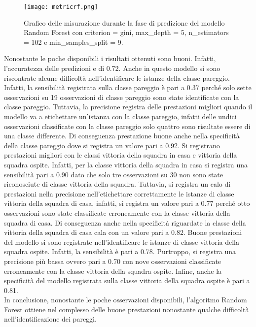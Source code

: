 \begin{figure}[]
	\begin{center}
		\texttt{[image: metricrf.png]}
		\caption{Grafico delle misurazione durante la fase di predizione del modello Random Forest con \textsf{criterion} = gini, \textsf{max\_depth} = 5, \textsf{n\_estimators} = 102 e \textsf{min\_samples\_split} = 9.
		} 
		\label{fig:rfmetrics}
	\end{center}
\end{figure}
Nonostante le poche disponibili i risultati ottenuti sono buoni. Infatti, l'accuratezza delle predizioni e di 0.72. Anche in questo modello si sono riscontrate alcune difficoltà nell'identificare le istanze della classe pareggio. Infatti, la sensibilità registrata sulla classe pareggio è pari a 0.37 perché solo sette osservazioni su 19 osservazioni di classe pareggio sono state identificate con la classe pareggio. Tuttavia, la precisione registra delle prestazioni migliori quando il modello va a etichettare un'istanza con la classe pareggio, infatti delle undici osservazioni classificate con la classe pareggio solo quattro sono risultate essere di una classe differente. Di conseguenza prestazione buone anche nella specificità della classe pareggio dove si registra un valore pari a 0.92. Si registrano prestazioni migliori con le classi vittoria della squadra in casa e vittoria della squadra ospite. Infatti, per la classe vittoria della squadra in casa si registra una sensibilità pari a 0.90 dato che solo tre osservazioni su 30 non sono state riconosciute di classe vittoria della squadra. Tuttavia, si registra un calo di prestazioni nella precisione nell'etichettare correttamente le istanze di classe vittoria della squadra di casa, infatti, si registra un valore pari a 0.77 perché otto osservazioni sono state classificate erroneamente con la classe vittoria della squadra di casa. Di conseguenza anche nella specificità riguardate la classe della vittoria della squadra di casa cala con un valore pari a 0.82. Buone prestazioni del modello si sono registrate nell'identificare le istanze di classe vittoria della squadra ospite. Infatti, la sensibilità è pari a 0.78. Purtroppo, si registra una precisione più bassa ovvero pari a 0.70 con nove osservazioni classificate erroneamente con la classe vittoria della squadra ospite. Infine, anche la specificità del modello registrata sulla classe vittoria della squadra ospite è pari a 0.81.\\
In conclusione, nonostante le poche osservazioni disponibili, l'algoritmo Random Forest ottiene nel complesso delle buone prestazioni nonostante qualche difficoltà nell’identificazione dei pareggi.


